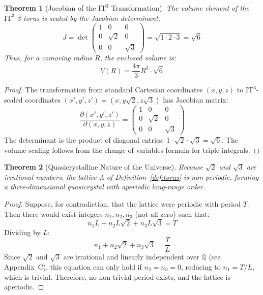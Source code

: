 \documentclass[12pt,a4paper,oneside]{article}
\newtheorem{theorem}{Theorem}[section]
\newcommand{\ITthree}{\text{IT}^3}
\begin{document}
\begin{theorem}[Jacobian of the $\ITthree$ Transformation]
\label{thm:jacobian}
The volume element of the $\ITthree$ 3-torus is scaled by the Jacobian determinant:
\begin{equation}
    \boxed{J = \det\begin{pmatrix}
        1 & 0 & 0 \\
        0 & \sqrt{2} & 0 \\
        0 & 0 & \sqrt{3}
    \end{pmatrix} = \sqrt{1 \cdot 2 \cdot 3} = \sqrt{6}}
\end{equation}
Thus, for a comoving radius $R$, the enclosed volume is:
\begin{equation}
    V(R) = \frac{4\pi}{3} R^3 \cdot \sqrt{6}
\end{equation}
\end{theorem}

\begin{proof}
The transformation from standard Cartesian coordinates $(x,y,z)$ to $\ITthree$-scaled coordinates $(x', y', z') = (x, y\sqrt{2}, z\sqrt{3})$ has Jacobian matrix:
\begin{equation}
    \frac{\partial(x', y', z')}{\partial(x, y, z)} = \begin{pmatrix}
        1 & 0 & 0 \\
        0 & \sqrt{2} & 0 \\
        0 & 0 & \sqrt{3}
    \end{pmatrix}
\end{equation}
The determinant is the product of diagonal entries: $1 \cdot \sqrt{2} \cdot \sqrt{3} = \sqrt{6}$. The volume scaling follows from the change of variables formula for triple integrals.
\end{proof}

\begin{theorem}[Quasicrystalline Nature of the Universe]
\label{thm:quasicrystal}
Because $\sqrt{2}$ and $\sqrt{3}$ are irrational numbers, the lattice $\Lambda$ of Definition~\ref{def:torus} is non-periodic, forming a three-dimensional quasicrystal with aperiodic long-range order.
\end{theorem}

\begin{proof}
Suppose, for contradiction, that the lattice were periodic with period $T$. Then there would exist integers $n_1, n_2, n_3$ (not all zero) such that:
\begin{equation}
    n_1 L + n_2 L\sqrt{2} + n_3 L\sqrt{3} = T
\end{equation}
Dividing by $L$:
\begin{equation}
    n_1 + n_2\sqrt{2} + n_3\sqrt{3} = \frac{T}{L}
\end{equation}
Since $\sqrt{2}$ and $\sqrt{3}$ are irrational and linearly independent over $\mathbb{Q}$ (see Appendix~C), this equation can only hold if $n_2 = n_3 = 0$, reducing to $n_1 = T/L$, which is trivial. Therefore, no non-trivial period exists, and the lattice is aperiodic.
\end{proof}
\end{document}
